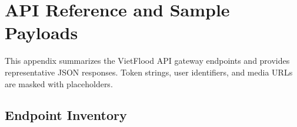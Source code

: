 
\begingroup
\setlength{\textfloatsep}{0.6em}
\setlength{\floatsep}{0.6em}
\setlength{\intextsep}{0.6em}
\setlength{\abovecaptionskip}{0.35em}
\setlength{\belowcaptionskip}{0.2em}
\lstset{
  aboveskip=0.2em,
  belowskip=0.2em,
  frame=none,
  numbers=none,
  xleftmargin=0pt,
  framexleftmargin=0pt,
}

\chapter{API Reference and Sample Payloads}

This appendix summarizes the VietFlood API gateway endpoints and provides representative JSON responses. Token strings, user identifiers, and media URLs are masked with placeholders.

\section{Endpoint Inventory}


